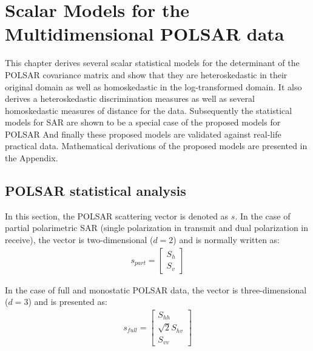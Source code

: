 \chapter{Scalar Models for the Multidimensional POLSAR data} %
\label{chap:polsar}

This chapter derives several scalar statistical models for the
                determinant of the POLSAR covariance matrix and
                show that they are heteroskedastic in their original
                domain as well as homoskedastic in the log-transformed
                domain.
It
                also derives a heteroskedastic discrimination measures
                 as well as several homoskedastic measures of
                distance for the data.
Subsequently the statistical models for SAR are shown to be a special case of
                the proposed models for POLSAR
And finally these proposed models are validated against real-life practical data.
Mathematical derivations of the proposed models are presented in the Appendix. %

\section{POLSAR statistical analysis}

In this section, the POLSAR scattering vector is denoted as $s$.
In the case of partial polarimetric SAR (single polarization in transmit and dual polarization in receive),
  the vector is two-dimensional ($d=2$) and is normally written as: 
\begin{align*}  
s_{part}=\begin{bmatrix}
S_h\\ 
S_v
\end{bmatrix}
\end{align*}

In the case of full and monostatic POLSAR data,
  the vector is three-dimensional ($d=3$) and is presented as:
\begin{align*}
s_{full}=\begin{bmatrix}
S_{hh}\\
\sqrt{2}S_{hv}\\
S_{vv}
\end{bmatrix}
\end{align*}

